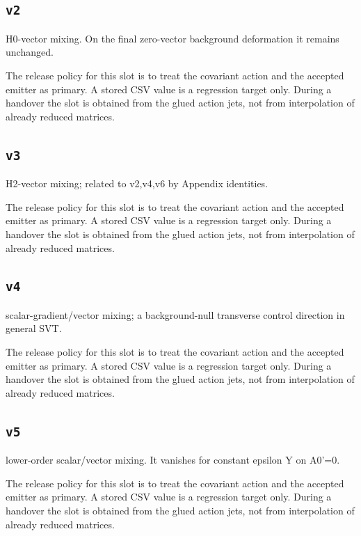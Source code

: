\documentclass[11pt,a4paper,oneside]{book}
\begin{document}
\subsection{\texttt{v2}}
H0-vector mixing. On the final zero-vector background deformation it remains unchanged.

The release policy for this slot is to treat the covariant action and the accepted emitter as primary. A stored CSV value is a regression target only. During a handover the slot is obtained from the glued action jets, not from interpolation of already reduced matrices.\par

\subsection{\texttt{v3}}
H2-vector mixing; related to v2,v4,v6 by Appendix identities.

The release policy for this slot is to treat the covariant action and the accepted emitter as primary. A stored CSV value is a regression target only. During a handover the slot is obtained from the glued action jets, not from interpolation of already reduced matrices.\par

\subsection{\texttt{v4}}
scalar-gradient/vector mixing; a background-null transverse control direction in general SVT.

The release policy for this slot is to treat the covariant action and the accepted emitter as primary. A stored CSV value is a regression target only. During a handover the slot is obtained from the glued action jets, not from interpolation of already reduced matrices.\par

\subsection{\texttt{v5}}
lower-order scalar/vector mixing. It vanishes for constant epsilon Y on A0'=0.

The release policy for this slot is to treat the covariant action and the accepted emitter as primary. A stored CSV value is a regression target only. During a handover the slot is obtained from the glued action jets, not from interpolation of already reduced matrices.\par
\end{document}
